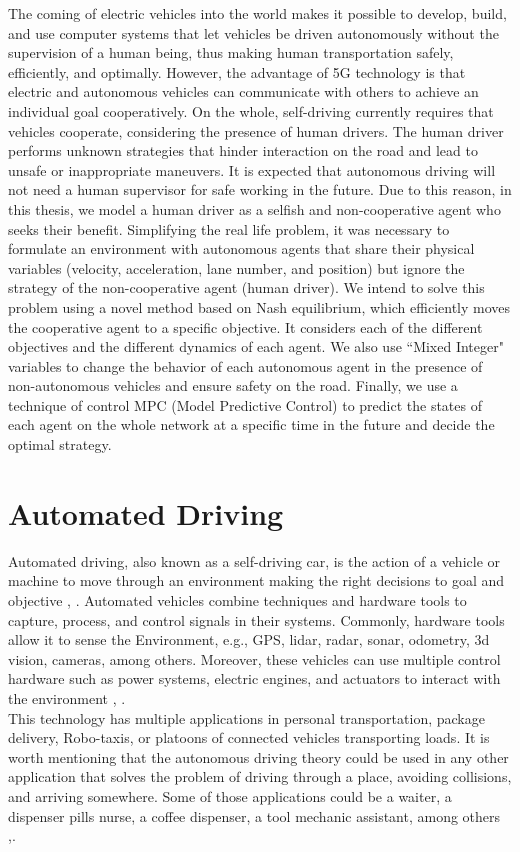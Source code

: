 The coming of electric vehicles into the world makes it possible to develop, build, and use computer systems that let vehicles be driven autonomously without the supervision of a human being, thus making human transportation safely, efficiently, and optimally. However, the advantage of 5G technology is that electric and autonomous vehicles can communicate with others to achieve an individual goal cooperatively. On the whole, self-driving currently requires that vehicles cooperate,  considering the presence of human drivers. The human driver performs unknown strategies that hinder interaction on the road and lead to unsafe or inappropriate maneuvers. It is expected that autonomous driving will not need a human supervisor for safe working in the future. Due to this reason, in this thesis, we model a human driver as a selfish and non-cooperative agent who seeks their benefit. Simplifying the real life problem, it was necessary to formulate an environment with autonomous agents that share their physical variables (velocity, acceleration, lane number, and position) but ignore the strategy of the non-cooperative agent (human driver). We intend to solve this problem using a novel method based on Nash equilibrium, which efficiently moves the cooperative agent to a specific objective. It considers each of the different objectives and the different dynamics of each agent. We also use ``Mixed Integer" variables to change the behavior of each autonomous agent in the presence of non-autonomous vehicles and ensure safety on the road. Finally, we use a technique of control MPC (Model Predictive Control) to predict the states of each agent on the whole network at a specific time in the future and decide the optimal strategy.\\
\section{Automated Driving}

Automated driving, also known as a self-driving car, is the action of a vehicle or machine to move through an environment making the right decisions to goal and objective \cite{Taeihagh_2018}, \cite{Thrun2010TowardRC}. Automated vehicles combine techniques and hardware tools to capture, process, and control signals in their systems. Commonly, hardware tools allow it to sense the  Environment, e.g., GPS, lidar, radar, sonar, odometry, 3d vision, cameras, among others. Moreover, these vehicles can use multiple control hardware such as power systems, electric engines, and actuators to interact with the environment  \cite{8957499}, \cite{811692}.
\\
This technology has multiple applications in personal transportation, package delivery, Robo-taxis, or platoons of connected vehicles transporting loads. It is worth mentioning that the autonomous driving theory could be used in any other application that solves the problem of
driving through a place, avoiding collisions, and arriving somewhere. Some of those applications could be a waiter, a dispenser pills nurse, a coffee dispenser, a tool mechanic assistant,
among others \cite{8957499},\cite{peter}.


